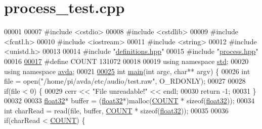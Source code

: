 \hypertarget{process__test_8cpp_source}{\section{process\+\_\+test.\+cpp}
\label{process__test_8cpp_source}
}

\begin{DoxyCode}
00001 
00007 \textcolor{preprocessor}{#include <cstdio>}
00008 \textcolor{preprocessor}{#include <cstdlib>}
00009 \textcolor{preprocessor}{#include <fcntl.h>}
00010 \textcolor{preprocessor}{#include <iostream>}
00011 \textcolor{preprocessor}{#include <string>}
00012 \textcolor{preprocessor}{#include <unistd.h>}
00013 
00014 \textcolor{preprocessor}{#include "\hyperlink{definitions_8hpp}{definitions.hpp}"}
00015 \textcolor{preprocessor}{#include "\hyperlink{process_8hpp}{process.hpp}"}
00016 
\hypertarget{process__test_8cpp_source_l00017}{}\hyperlink{process__test_8cpp_a698c124f1c293f98840449d6c5b9d984}{00017} \textcolor{preprocessor}{#define COUNT 131072}
00018 
00019 \textcolor{keyword}{using namespace }\hyperlink{namespacestd}{std};
00020 \textcolor{keyword}{using namespace }\hyperlink{namespaceavda}{avda};
00021 
\hypertarget{process__test_8cpp_source_l00025}{}\hyperlink{process__test_8cpp_a3c04138a5bfe5d72780bb7e82a18e627}{00025} \textcolor{keywordtype}{int} \hyperlink{process__test_8cpp_a3c04138a5bfe5d72780bb7e82a18e627}{main}(\textcolor{keywordtype}{int} argc, \textcolor{keywordtype}{char}** argv) \{
00026     \textcolor{keywordtype}{int} file = open(\textcolor{stringliteral}{"/home/pi/avda/etc/audio/test.raw"}, O\_RDONLY);
00027 
00028     \textcolor{keywordflow}{if}(file < 0) \{
00029         cerr << \textcolor{stringliteral}{"File unreadable!"} << endl;
00030         \textcolor{keywordflow}{return} -1;
00031     \}
00032 
00033     \hyperlink{definitions_8hpp_aacdc525d6f7bddb3ae95d5c311bd06a1}{float32}* buffer = (\hyperlink{definitions_8hpp_aacdc525d6f7bddb3ae95d5c311bd06a1}{float32}*)malloc(\hyperlink{process__test_8cpp_a698c124f1c293f98840449d6c5b9d984}{COUNT} * \textcolor{keyword}{sizeof}(\hyperlink{definitions_8hpp_aacdc525d6f7bddb3ae95d5c311bd06a1}{float32}));
00034     \textcolor{keywordtype}{int} charRead = read(file, buffer, \hyperlink{process__test_8cpp_a698c124f1c293f98840449d6c5b9d984}{COUNT} * \textcolor{keyword}{sizeof}(\hyperlink{definitions_8hpp_aacdc525d6f7bddb3ae95d5c311bd06a1}{float32}));
00035 
00036     \textcolor{keywordflow}{if}(charRead < \hyperlink{process__test_8cpp_a698c124f1c293f98840449d6c5b9d984}{COUNT}) \{

\end{DoxyCode}
